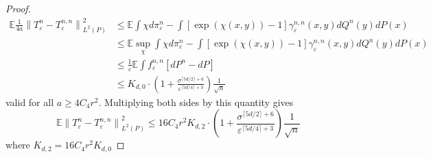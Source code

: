 \documentclass{article}
\theoremstyle{definition}
\newcommand{\feps}{f_\varepsilon}
\newcommand{\Teps}{T_\varepsilon}
\newcommand{\norm}[1]{\left\lVert#1\right\rVert}
\begin{document}
\begin{proof}
    \begin{align*}
        \mathbb{E}\frac{1}{4a}\norm{\Teps^n - \Teps^{n,n}}_{L^2(P)}^2 &\leq \mathbb{E}\int \chi d\pi_\varepsilon^n - \int  \left [ \exp\left ( \chi(x,y) \right ) - 1 \right ] \gamma_\varepsilon^{n,n}(x,y) dQ^n(y)dP(x) \\
        &\leq \mathbb{E} \sup_\chi \int \chi d\pi_\varepsilon^n - \int  \left [ \exp\left ( \chi(x,y) \right ) - 1 \right ] \gamma_\varepsilon^{n,n}(x,y) dQ^n(y)dP(x) \\
        &\leq \frac{1}{\varepsilon}\mathbb{E}\int \feps^{n,n} [dP^n - dP]  \\
        &\leq K_{d,0} \cdot \left ( 1 + \frac{\sigma^{\lceil 5d/2\rceil + 6}}{\varepsilon^{\lceil 5d / 4 \rceil + 3}}\right ) \frac{1}{\sqrt{n}}
    \end{align*}
    valid for all $a \geq 4C_4r^2$. Multiplying both sides by this quantity gives
    \begin{equation*}
        \mathbb{E}\norm{\Teps^n - \Teps^{n,n}}_{L^2(P)}^2 \leq 16C_4r^2  K_{d,2} \cdot \left ( 1 + \frac{\sigma^{\lceil 5d/2\rceil + 6}}{\varepsilon^{\lceil 5d / 4 \rceil + 3}}\right ) \frac{1}{\sqrt{n}}
    \end{equation*}
    where $K_{d,2} = 16C_4r^2  K_{d,0}$
\end{proof}
\end{document}
